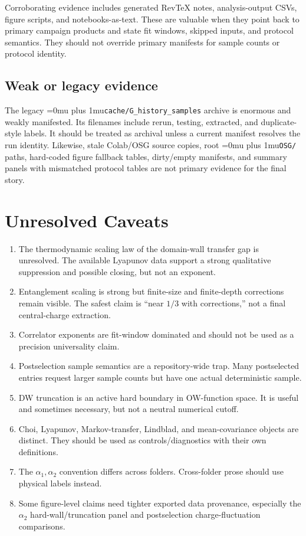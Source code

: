 \documentclass[aps,prb,onecolumn,nofootinbib,superscriptaddress]{revtex4-2}
\newcommand{\src}[1]{\begingroup\ttfamily\Urlmuskip=0mu plus 1mu\relax\nolinkurl{#1}\endgroup}
\begin{document}
Corroborating evidence includes generated RevTeX notes, analysis-output CSVs, figure scripts, and notebooks-as-text.  These are valuable when they point back to primary campaign products and state fit windows, skipped inputs, and protocol semantics.  They should not override primary manifests for sample counts or protocol identity.

\subsection{Weak or legacy evidence}

The legacy \src{cache/G_history_samples} archive is enormous and weakly manifested.  Its filenames include rerun, testing, extracted, and duplicate-style labels.  It should be treated as archival unless a current manifest resolves the run identity.  Likewise, stale Colab/OSG source copies, root \src{OSG/} paths, hard-coded figure fallback tables, dirty/empty manifests, and summary panels with mismatched protocol tables are not primary evidence for the final story.

\section{Unresolved Caveats}

\begin{enumerate}
\item The thermodynamic scaling law of the domain-wall transfer gap is unresolved.  The available Lyapunov data support a strong qualitative suppression and possible closing, but not an exponent.
\item Entanglement scaling is strong but finite-size and finite-depth corrections remain visible.  The safest claim is ``near \(1/3\) with corrections,'' not a final central-charge extraction.
\item Correlator exponents are fit-window dominated and should not be used as a precision universality claim.
\item Postselection sample semantics are a repository-wide trap.  Many postselected entries request larger sample counts but have one actual deterministic sample.
\item DW truncation is an active hard boundary in OW-function space.  It is useful and sometimes necessary, but not a neutral numerical cutoff.
\item Choi, Lyapunov, Markov-transfer, Lindblad, and mean-covariance objects are distinct.  They should be used as controls/diagnostics with their own definitions.
\item The \(\alpha_1,\alpha_2\) convention differs across folders.  Cross-folder prose should use physical labels instead.
\item Some figure-level claims need tighter exported data provenance, especially the \(\alpha_2\) hard-wall/truncation panel and postselection charge-fluctuation comparisons.
\end{enumerate}
\end{document}
